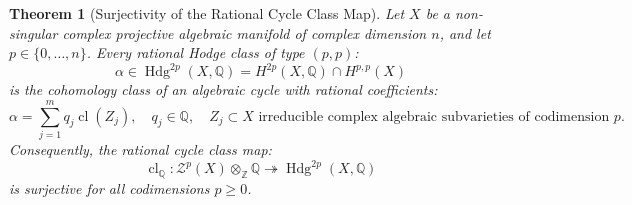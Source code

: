\documentclass[11pt,a4paper]{article}
\theoremstyle{definition}
\theoremstyle{plain}
\newtheorem{theorem}[definition]{Theorem}
\DeclareMathOperator{\Hdg}{Hdg}
\DeclareMathOperator{\cl}{cl}
\begin{document}
\begin{theorem}[Surjectivity of the Rational Cycle Class Map]
\label{thm:hodge_master_resolution}
Let $X$ be a non-singular complex projective algebraic manifold of complex dimension $n$, and let $p \in \{0, \dots, n\}$. Every rational Hodge class of type $(p,p)$:
\begin{equation}
    \label{eq:hodge_class_inclusion}
    \alpha \in \Hdg^{2p}(X, \mathbb{Q}) = H^{2p}(X, \mathbb{Q}) \cap H^{p,p}(X)
\end{equation}
is the cohomology class of an algebraic cycle with rational coefficients:
\begin{equation}
    \label{eq:rational_cycle_sum}
    \alpha = \sum_{j=1}^m q_j \cl(Z_j), \quad q_j \in \mathbb{Q}, \quad Z_j \subset X \text{ irreducible complex algebraic subvarieties of codimension } p.
\end{equation}
Consequently, the rational cycle class map:
\begin{equation}
    \label{eq:cycle_class_surjective_final}
    \cl_{\mathbb{Q}}: \mathcal{Z}^p(X) \otimes_{\mathbb{Z}} \mathbb{Q} \twoheadrightarrow \Hdg^{2p}(X, \mathbb{Q})
\end{equation}
is surjective for all codimensions $p \ge 0$.
\end{theorem}
\end{document}
